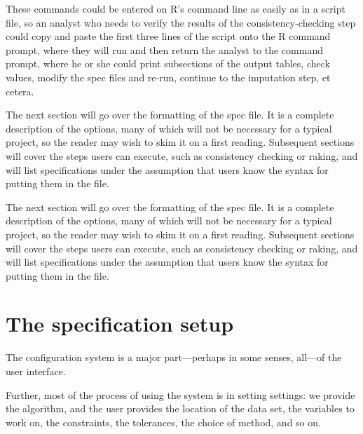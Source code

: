 \documentclass{article}
\begin{document}
These commands could be entered on R's command line as easily as in a script file, so an
analyst who needs to verify the results of the consistency-checking step could copy and
paste the first three lines of the script onto the R command prompt, where they will run and
then return the analyst to the command prompt, where he or she could print subsections of
the output tables, check values, modify the spec files and re-run, continue to the
imputation step, et cetera.

The next section will go over the formatting of the spec file. It is a complete
description of the options, many of which will not be necessary for a typical project, so
the reader may wish to skim it on a first reading. Subsequent sections will cover the 
steps users can execute, such as consistency checking or raking, and will list
specifications under the assumption that users know the syntax for putting them in the
file.

The next section will go over the formatting of the spec file. It is a complete
description of the options, many of which will not be necessary for a typical project, so
the reader may wish to skim it on a first reading. Subsequent sections will cover the 
steps users can execute, such as consistency checking or raking, and will list
specifications under the assumption that users know the syntax for putting them in the
file.


\section{The specification setup}\label{specsyntax}
The configuration system is a major part---perhaps in some senses, all---of the
user interface. 

Further, most of the process of using the system is in setting
settings: we provide the algorithm, and the user provides the location of the
data set, the variables to work on, the constraints, the tolerances, the choice
of method, and so on. 
\end{document}
